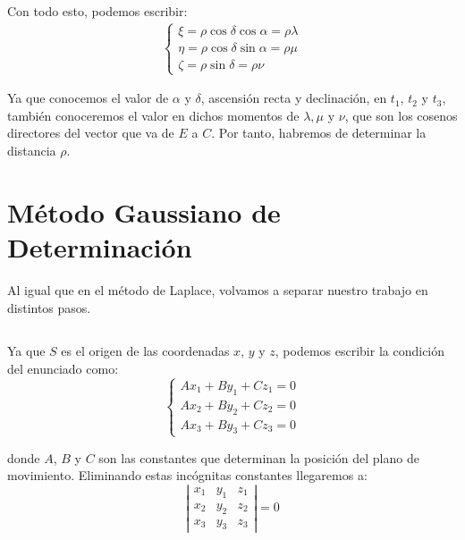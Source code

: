 \documentclass[11pt]{article}
\begin{document}
Con todo esto, podemos escribir:
\begin{align}
\left\{
\begin{array}{l}
\xi = \rho \cos{\delta}\cos{\alpha} = \rho\lambda\\
\eta = \rho \cos{\delta}\sin{\alpha} = \rho\mu\\
\zeta = \rho \sin{\delta} = \rho\nu
\end{array}
\right.
\label{eq:terminologia}
\end{align}

Ya que conocemos el valor de $\alpha$ y $\delta$, ascensión recta y declinación, en $t_1$, $t_2$ y $t_3$, también conoceremos el valor en dichos momentos de $\lambda, \mu$ y $\nu$, que son los cosenos directores del vector que va de $E$ a $C$. Por tanto, habremos de determinar la distancia $\rho$.\\










\iffalse



\section{Método Gaussiano de Determinación}
Al igual que en el método de Laplace, volvamos a separar nuestro trabajo en distintos pasos.\\

\subsection{}
Ya que $S$ es el origen de las coordenadas $x$, $y$ y $z$, podemos escribir la condición del enunciado como:
\[
\left\{
\begin{array}{l}
	Ax_1+By_1+Cz_1=0\\
	Ax_2+By_2+Cz_2=0\\
	Ax_3+By_3+Cz_3=0
\end{array}
\right.
\]

\noindent donde $A$, $B$ y $C$ son las constantes que determinan la posición del plano de movimiento. Eliminando estas incógnitas constantes llegaremos a:
\[
\left|
\begin{array}{ccc}
	x_1 & y_1 & z_1\\
	x_2 & y_2 & z_2\\
	x_3 & y_3 & z_3
\end{array}
\right|
=0
\]
\end{document}
